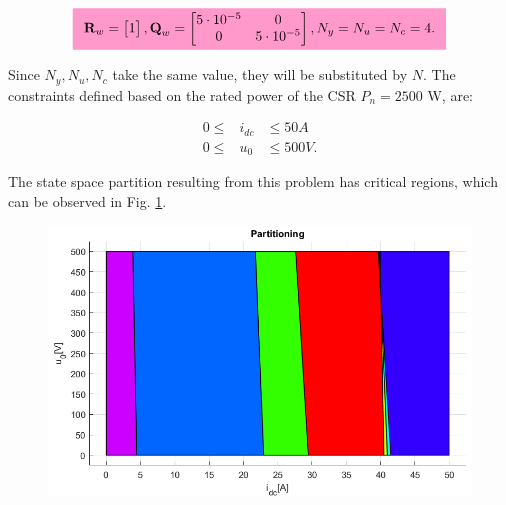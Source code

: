     \begin{equation}
    \hlcmath{PT}{
        \begin{array}{l}
            \textbf{R}_w=\begin{bmatrix}
                1\\
            \end{bmatrix},
            \textbf{Q}_w=\begin{bmatrix}
                5\cdot10^{-5}& 0\\
                0& 5\cdot10^{-5}\\
            \end{bmatrix},
            N_y=N_u=N_c=4.
        \end{array}}
        \label{EMPC:equ:quadratic_mtx_set}
    \end{equation}

    Since $N_y,N_u,N_c$ take the same value, they will be substituted by $N$.
    The constraints defined based on the rated power of the CSR $P_n=2500$ W, are:

    \begin{equation}
        \begin{array}{rcl}
            0\leq&i_{dc}&\leq 50A\\
            0\leq&u_{0}&\leq 500V.
        \end{array}
        \label{EMPC:equ:numeric_constraints}
    \end{equation}

    The state space partition resulting from this problem has  critical regions, which can be observed in Fig. \ref{EMPC:fig:regions}.

    \begin{figure}[!ht]
        \centering
        \includegraphics[width=\textwidth]{EMPC_PNG_Pics/Regions2_trans.png}
        \caption{}
        \label{EMPC:fig:regions}
    \end{figure}

